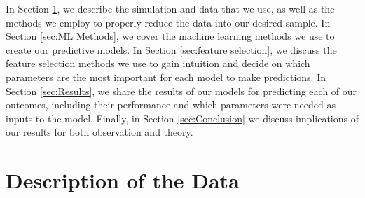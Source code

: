 \documentclass[fleqn,usenatbib]{mnras}
\begin{document}
In Section \ref{sec:simulation}, we describe the simulation and data that we use, as well as the methods we employ to properly reduce the data into our desired sample. In Section \ref{sec:ML Methods}, we cover the machine learning methods we use to create our predictive models. In Section \ref{sec:feature selection}, we discuss the feature selection methods we use to gain intuition and decide on which parameters are the most important for each model to make predictions. In Section \ref{sec:Results}, we share the results of our models for predicting each of our outcomes, including their performance and which parameters were needed as inputs to the model. Finally, in Section \ref{sec:Conclusion} we discuss implications of our results for both observation and theory.

\section{Description of the Data}
\label{sec:simulation}
\end{document}
